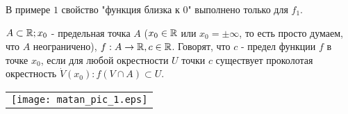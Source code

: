 \documentclass[12pt]{report}
\begin{document}
\begin{ex}[2]
В примере $1$ свойство "функция близка к $0$" выполнено только для $f_1$.
\end{ex}

\begin{defn}
$A \subset \mathbb{R}; x_0$ - предельная точка $A$ ($x_0 \in \mathbb{R}$ или $x_0 = \pm \infty$, то есть просто думаем, что $A$ неограничено), $f: A \to \mathbb{R}, c \in \mathbb{R}$. Говорят, что $c$ - предел функции $f$ в точке $x_0$, если для любой окрестности $U$ точки $c$ существует проколотая окрестность $\dot V(x_0): f(V \cap A) \subset U$.
\end{defn}

\begin{center}
\begin{tabular}{c}
\texttt{[image: matan\_pic\_1.eps]}\\
\end{tabular}
\end{center}
\end{document}
